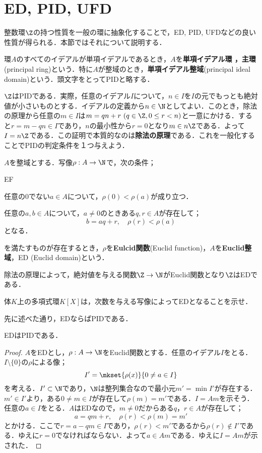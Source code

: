 \section{ED, PID, UFD}
整数環$\Z$の持つ性質を一般の環に抽象化することで，ED, PID, UFDなどの良い性質が得られる．本節ではそれについて説明する．

\begin{defi}[PID]
	環$A$のすべてのイデアルが単項イデアルであるとき，$A$を\textbf{単項イデアル環
		，主環\footnotemark}(principal ring)という．特に$A$が整域のとき，\textbf{単項イデアル整域}(principal ideal domain)という．頭文字をとってPIDと略する．
\end{defi}

$\Z$はPIDである．実際，任意のイデアル$I$について，$n\in I$を$I$の元でもっとも絶対値が小さいものとする．イデアルの定義から$n\in\N$としてよい．このとき，除法の原理から任意の$m\in I$は$m=qn+r~(q\in\Z,0\leq r<n)$と一意にかける．すると$r=m-qn\in I$であり，$n$の最小性から$r=0$となり$m\in n\Z$である．よって$I=n\Z$である．この証明で本質的なのは\textbf{除法の原理}である．これを一般化することでPIDの判定条件を１つ与えよう．

\begin{defi}[Euclid整域]
	$A$を整域とする．写像$\rho:A\to\N$で，次の条件；
	\begin{defiterm}{EF}
		\item 任意の$0$でない$a\in A$について，$\rho(0)<\rho(a)$が成り立つ．
		\item 任意の$a,b\in A$について，$a\neq0$のときある$q,r\in A$が存在して；
		\[b=aq+r,\quad \rho(r)<\rho(a)\]
		となる．
	\end{defiterm}
	を満たすものが存在するとき，$\rho$を\textbf{Eulcid関数}(Euclid function)，$A$を\textbf{Euclid整域}，ED (Euclid domain)という．
\end{defi}

除法の原理によって，絶対値を与える関数$\Z\to\N$がEuclid関数となり$\Z$はEDである．
\begin{exer}
	体$K$上の多項式環$K[X]$は，次数を与える写像によってEDとなることを示せ．	
\end{exer}

先に述べた通り，EDならばPIDである．
\begin{thm}
	EDはPIDである．
\end{thm}
\begin{proof}
	$A$をEDとし，$\rho:A\to\N$をEuclid関数とする．任意のイデアル$I$をとる．$I\setminus\{0\}$の$\rho$による像；
	\[I'=\mkset{\rho(x)}{0\neq a\in I}\]
	を考える．$I'\subset\N$であり，$\N$は整列集合なので最小元$m'=\min I'$が存在する．$m'\in I'$より，ある$0\neq m\in I$が存在して$\rho(m)=m'$である．$I=Am$を示そう．任意の$a\in I$をとる．$A$はEDなので，$m\neq0$だからある$q，r\in A$が存在して；
	\[a=qm+r,\quad \rho(r)<\rho(m)=m'\]
	とかける．ここで$r=a-qm\in I$であり，$\rho(r)<m'$であるから$\rho(r)\not\in I'$である．ゆえに$r=0$でなければならない．よって$a\in Am$である．ゆえに$I=Am$が示された．
\end{proof}

